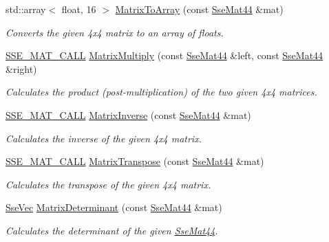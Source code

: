 {\bf }\par
\begin{DoxyCompactItemize}
\item 
std\+::array$<$ float, 16 $>$ \hyperlink{namespacegofxmath_a5f87ab4eb6093d145cda3e6772c6bc0a}{Matrix\+To\+Array} (const \hyperlink{classgofxmath_1_1_sse_mat44}{Sse\+Mat44} \&mat)
\begin{DoxyCompactList}\small\item\em Converts the given 4x4 matrix to an array of floats. \end{DoxyCompactList}\item 
\hyperlink{ssemat__math__defs_8h_a741f88d5589197d03fea9ab2b7622b8a}{S\+S\+E\+\_\+\+M\+A\+T\+\_\+\+C\+A\+L\+L} \hyperlink{namespacegofxmath_ab38872b965a424d2660e1c4be71ddbe6}{Matrix\+Multiply} (const \hyperlink{classgofxmath_1_1_sse_mat44}{Sse\+Mat44} \&left, const \hyperlink{classgofxmath_1_1_sse_mat44}{Sse\+Mat44} \&right)
\begin{DoxyCompactList}\small\item\em Calculates the product (post-\/multiplication) of the two given 4x4 matrices. \end{DoxyCompactList}\item 
\hyperlink{ssemat__math__defs_8h_a741f88d5589197d03fea9ab2b7622b8a}{S\+S\+E\+\_\+\+M\+A\+T\+\_\+\+C\+A\+L\+L} \hyperlink{namespacegofxmath_a7d63a634b20c220ad6047dc4633bf70f}{Matrix\+Inverse} (const \hyperlink{classgofxmath_1_1_sse_mat44}{Sse\+Mat44} \&mat)
\begin{DoxyCompactList}\small\item\em Calculates the inverse of the given 4x4 matrix. \end{DoxyCompactList}\item 
\hyperlink{ssemat__math__defs_8h_a741f88d5589197d03fea9ab2b7622b8a}{S\+S\+E\+\_\+\+M\+A\+T\+\_\+\+C\+A\+L\+L} \hyperlink{namespacegofxmath_a8c2545c52a86496bdf8917a1158f6f24}{Matrix\+Transpose} (const \hyperlink{classgofxmath_1_1_sse_mat44}{Sse\+Mat44} \&mat)
\begin{DoxyCompactList}\small\item\em Calculates the transpose of the given 4x4 matrix. \end{DoxyCompactList}\item 
\hyperlink{namespacegofxmath_a634570ddcd2496053ee966227080e02f}{Sse\+Vec} \hyperlink{namespacegofxmath_a6709364ddedc83299a1d6a58607a87aa}{Matrix\+Determinant} (const \hyperlink{classgofxmath_1_1_sse_mat44}{Sse\+Mat44} \&mat)
\begin{DoxyCompactList}\small\item\em Calculates the determinant of the given \hyperlink{classgofxmath_1_1_sse_mat44}{Sse\+Mat44}. \end{DoxyCompactList}\item 

\end{DoxyCompactItemize}
